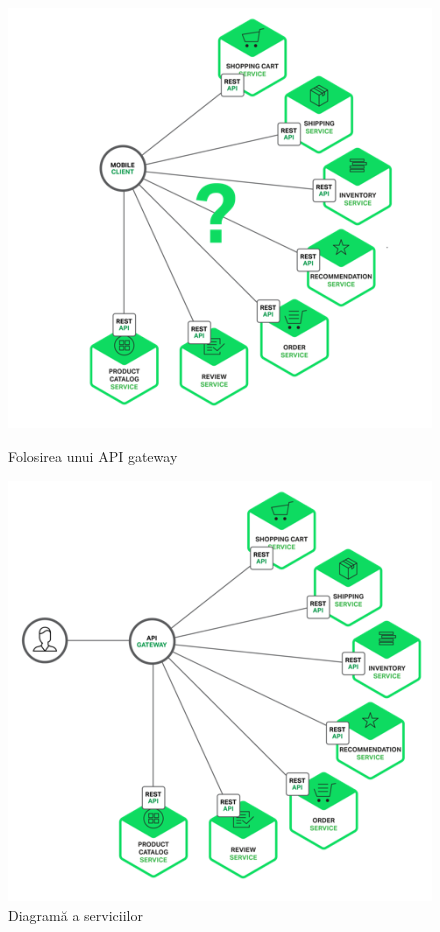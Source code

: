 \documentclass[12pt, a4paper, oneside, romanian]{teza-upb}
\begin{document}
\begin{figure}[ht]
\centering
\begin{minipage}{0.45\textwidth}
\centering
\includegraphics[scale=0.5]{img/Richardson-microservices-part2-2_microservices-client.png}
\caption{Folosirea unui API gateway}
\end{minipage}\hfill
\begin{minipage}{0.45\textwidth}
\centering
\includegraphics[scale=0.5]{img/Richardson-microservices-part2-3_api-gateway.png}
\caption{Diagramă a serviciilor}
\end{minipage}
\end{figure}
\newpage
\end{document}
